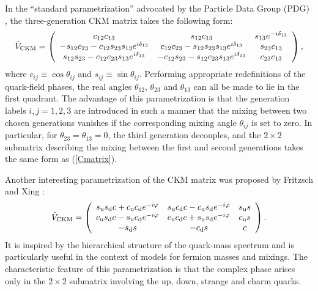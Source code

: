 \documentclass[12pt]{article}
\begin{document}
In the ``standard parametrization'' advocated by the Particle Data Group
(PDG) \cite{PDG}, the three-generation CKM matrix takes the following 
form:
\begin{equation}\label{standard}
\hat V_{\rm CKM}=\left(\begin{array}{ccc}
c_{12}c_{13}&s_{12}c_{13}&s_{13}e^{-i\delta_{13}}\\ -s_{12}c_{23}
-c_{12}s_{23}s_{13}e^{i\delta_{13}}&c_{12}c_{23}-
s_{12}s_{23}s_{13}e^{i\delta_{13}}&
s_{23}c_{13}\\ s_{12}s_{23}-c_{12}c_{23}s_{13}e^{i\delta_{13}}&-c_{12}s_{23}
-s_{12}c_{23}s_{13}e^{i\delta_{13}}&c_{23}c_{13}
\end{array}\right),
\end{equation}
where $c_{ij}\equiv\cos\theta_{ij}$ and $s_{ij}\equiv\sin\theta_{ij}$. 
Performing appropriate redefinitions of the quark-field phases, the real 
angles $\theta_{12}$, $\theta_{23}$ and $\theta_{13}$ can all be made to
lie in the first quadrant. The advantage of this parametrization is that
the generation labels $i,j=1,2,3$ are introduced in such a manner that
the mixing between two chosen generations vanishes if the corresponding
mixing angle $\theta_{ij}$ is set to zero. In particular, for 
$\theta_{23}=\theta_{13}=0$, the third generation decouples, and the
$2\times2$ submatrix describing the mixing between the first and 
second generations takes the same form as (\ref{Cmatrix}).

Another interesting parametrization of the CKM matrix was proposed by 
Fritzsch and Xing \cite{FX}:
\begin{equation}
\hat V_{\rm CKM}=\left(\begin{array}{ccc}
s_{\rm u} s_{\rm d} c + c_{\rm u} c_{\rm d} e^{-i\varphi} & 
s_{\rm u} c_{\rm d} c - c_{\rm u} s_{\rm d} e^{-i\varphi} &s_{\rm u} s\\
c_{\rm u} s_{\rm d} c - s_{\rm u} c_{\rm d} e^{-i\varphi} & 
c_{\rm u} c_{\rm d} c + s_{\rm u} s_{\rm d} e^{-i\varphi} &c_{\rm u} s\\
-s_{\rm d}s & -c_{\rm d}s & c
\end{array}\right).
\end{equation}
It is inspired by the hierarchical structure of the quark-mass spectrum
and is particularly useful in the context of models for fermion masses and
mixings. The characteristic feature of this parametrization is that
the complex phase arises only in the $2\times2$ submatrix involving
the up, down, strange and charm quarks. 
\end{document}
